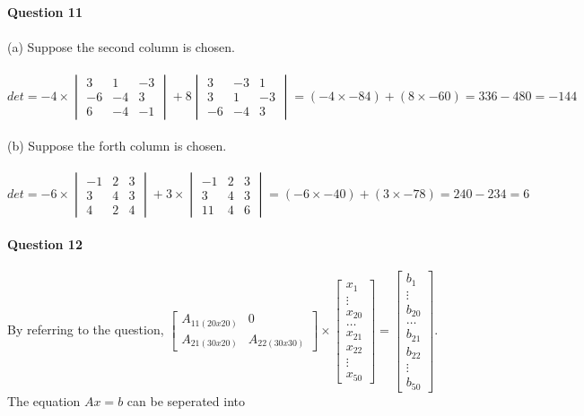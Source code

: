 \documentclass{article}
\begin{document}
\\\\
\noindent\textbf{Question 11}
\\\\
\indent(a)\indent
\space Suppose the second column is chosen.
\\\\
\indent\indent\indent $det = -4 \times \begin{vmatrix}3&1&-3\\-6&-4&3\\6&-4&-1\end{vmatrix} + 8\begin{vmatrix}3&-3&1\\3&1&-3\\-6&-4&3\end{vmatrix} = (-4 \times -84) + (8 \times -60) = 336 - 480 = -144$
\\\\
\indent(b)\indent
\space Suppose the forth column is chosen.
\\\\
\indent\indent\indent $det = -6 \times \begin{vmatrix}-1&2&3\\3&4&3\\4&2&4\end{vmatrix} + 3 \times \begin{vmatrix}-1&2&3\\3&4&3\\11&4&6\end{vmatrix} = (-6 \times -40) + (3 \times -78) = 240 - 234 = 6$
\\\\
\noindent\textbf{Question 12}
\\\\
By referring to the question, $\begin{bmatrix}A_{11(20x20)}&0\\A_{21(30x20)}&A_{22(30x30)}\end{bmatrix} \times \begin{bmatrix}x_1\\\vdots\\x_{20}\\\hdots\\x_{21}\\x_{22}\\\vdots\\x_{50}\end{bmatrix} = \begin{bmatrix}b_1\\\vdots\\b_{20}\\\hdots\\b_{21}\\b_{22}\\\vdots\\b_{50}\end{bmatrix}$. The equation $Ax = b$ can be seperated into
\end{document}
